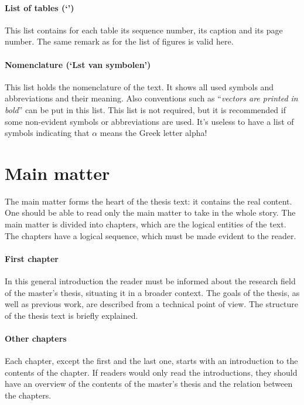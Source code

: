 \documentclass[11pt,article,oneside,british,extralanguage=dutch]{kulemt}
\newcommand\Dutch[1]{`{\selectlanguage{dutch}#1}'}
\begin{document}
\paragraph{List of tables (\Dutch{\listtablename})} This list contains
for each table its sequence number, its caption and its page number. The same
remark as for the list of figures is valid here.

\paragraph{Nomenclature (\Dutch{L\ij st van symbolen})} This list holds the
nomenclature of the text. It shows all used symbols and abbreviations and
their meaning. Also conventions such as ``\emph{vectors are printed in
  bold}'' can be put in this list. This list is not required, but it is
recommended if some non-evident symbols or abbreviations are used. It's
useless to have a list of symbols indicating that $\alpha$ means the Greek
letter alpha!

\section{Main matter}
The main matter forms the heart of the thesis text: it contains the real
content. One should be able to read only the main matter to take in the
whole story. The main matter is divided into chapters, which are the
logical entities of the text. The chapters have a logical sequence, which
must be made evident to the reader.

\paragraph{First chapter} In this general introduction the reader must be
informed about the research field of the master's thesis, situating it in a
broader context. The goals of the thesis, as well as previous work, are
described from a technical point of view. The structure of the thesis text
is briefly explained.

\paragraph{Other chapters} Each chapter, except the first and the last one,
starts with an introduction to the contents of the chapter. If readers
would only read the introductions, they should have an overview of the
contents of the master's thesis and the relation between the chapters.
\end{document}
